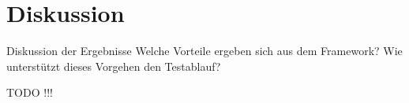 \chapter{Diskussion}
\label{cha:Diskussion}

Diskussion der Ergebnisse
Welche Vorteile ergeben sich aus dem Framework?
Wie unterstützt dieses Vorgehen den Testablauf?

TODO !!!
